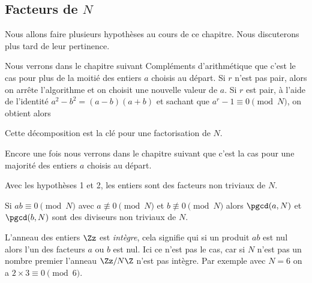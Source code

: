 \documentclass[11pt,class=report,crop=false]{standalone}
\begin{document}
\subsection{Facteurs de $N$}

Nous allons faire plusieurs hypothèses au cours de ce chapitre. Nous discuterons plus tard de leur pertinence.

\bigskip


\bigskip

Nous verrons dans le chapitre suivant \og{}Compléments d'arithmétique\fg{} que c'est le cas pour plus de la moitié des entiers $a$ choisis au départ.
Si $r$ n'est pas pair, alors on arrête l'algorithme et on choisit une nouvelle valeur de $a$.
Si $r$ est pair, à l'aide de l'identité $a^2-b^2 = (a-b)(a+b)$ et sachant que $a^r-1 \equiv 0 \pmod N$, on obtient alors 

Cette décomposition est la clé pour une factorisation de $N$.

\bigskip


\bigskip

Encore une fois nous verrons dans le chapitre suivant que c'est la cas pour une majorité des entiers $a$ choisis au départ.

\begin{proposition}
Avec les hypothèses 1 et 2, les entiers
sont des facteurs non triviaux de $N$.
\end{proposition}

\begin{lemme}
Si $ab \equiv 0 \pmod N$ avec $a \not\equiv 0 \pmod N$ et $b \not\equiv 0 \pmod N$ alors $\pgcd(a,N)$ et $\pgcd(b,N)$ sont des diviseurs non triviaux de $N$.
\end{lemme}

\begin{remarque*}
L'anneau des entiers $\Zz$ est \emph{intègre}, cela signifie qui si un produit $ab$ est nul alors l'un des facteurs $a$ ou $b$ est nul. Ici ce n'est pas le cas, car si $N$ n'est pas un nombre premier l'anneau $\Zz/N\Z$ n'est pas intègre. Par exemple avec $N=6$ on a 
$2 \times  3 \equiv 0 \pmod 6$.
\end{remarque*}
\end{document}
